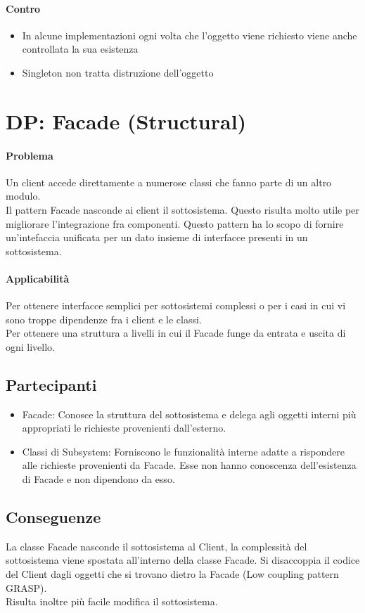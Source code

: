 \paragraph*{Contro}
\begin{itemize}
    \item In alcune implementazioni ogni volta che l'oggetto viene richiesto viene anche
    controllata la sua esistenza
    \item Singleton non tratta distruzione dell'oggetto
\end{itemize}
\section{DP: Facade (Structural)}
\paragraph*{Problema} Un client accede direttamente a numerose classi che fanno parte di un altro
modulo. \\
Il pattern Facade nasconde ai client il sottosistema. Questo risulta molto utile per migliorare
l'integrazione fra componenti. Questo pattern ha lo scopo di fornire un'intefaccia unificata per
un dato insieme di interfacce presenti in un sottosistema.
\paragraph*{Applicabilità}
Per ottenere interfacce semplici per sottosistemi complessi o per i casi in cui vi sono
troppe dipendenze fra i client e le classi. \\
Per ottenere una struttura a livelli in cui il Facade funge da entrata e uscita di ogni
livello.
\subsection*{Partecipanti}
\begin{itemize}
    \item Facade: Conosce la struttura del sottosistema e delega agli oggetti interni più
    appropriati le richieste provenienti dall'esterno.
    \item Classi di Subsystem: Forniscono le funzionalità interne adatte a rispondere alle richieste
    provenienti da Facade. Esse non hanno conoscenza dell'esistenza di Facade e non dipendono da esso.
\end{itemize}
\subsection*{Conseguenze}
La classe Facade nasconde il sottosistema al Client, la complessità del sottosistema viene
spostata all'interno della classe Facade. Si disaccoppia il codice del Client dagli oggetti
che si trovano dietro la Facade (Low coupling pattern GRASP).\\
Risulta inoltre più facile modifica il sottosistema.
